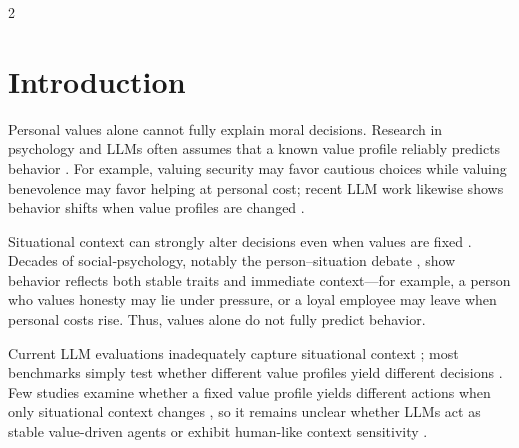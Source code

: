 \documentclass[11pt]{article}
\begin{document}
\begin{multicols}{2}

\section{Introduction}
\label{sec:intro}

    Personal values alone cannot fully explain moral decisions. Research in psychology and LLMs often assumes that a known value profile reliably predicts behavior \citep{jiao2025ai, harry2026beyond, backmann2025ethics}. For example, valuing security may favor cautious choices while valuing benevolence may favor helping at personal cost; recent LLM work likewise shows behavior shifts when value profiles are changed \citep{sauter2026between, guo2026counterfactual}.
    
    Situational context can strongly alter decisions even when values are fixed \citep{nabizadeh2026large, sauter2026between, backmann2025ethics}. Decades of social‑psychology, notably the person–situation debate \citep{harry2026beyond, soni2025we, peterson2025context}, show behavior reflects both stable traits and immediate context—for example, a person who values honesty may lie under pressure, or a loyal employee may leave when personal costs rise. Thus, values alone do not fully predict behavior.  
    
    Current LLM evaluations inadequately capture situational context \citep{scherrer2023evaluating, mahajan2025mapping, schacht2025mapping}; most benchmarks simply test whether different value profiles yield different decisions \citep{guo2026counterfactual, scherrer2023evaluating, jiao2025ai}. Few studies examine whether a fixed value profile yields different actions when only situational context changes \citep{harry2026beyond, sauter2026between, backmann2025ethics}, so it remains unclear whether LLMs act as stable value-driven agents or exhibit human-like context sensitivity \citep{harry2026beyond, backmann2025ethics, jiaqi2025comparative}.
  
    
  

\end{multicols}
\end{document}
